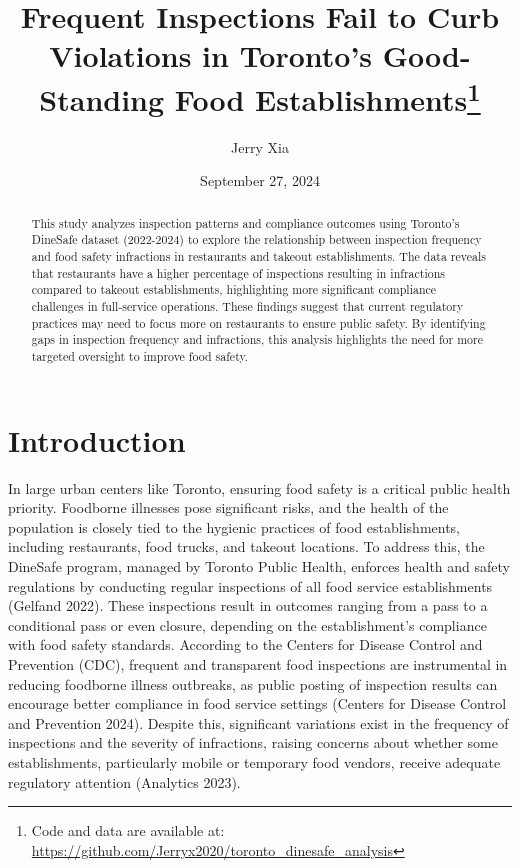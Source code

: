 \documentclass[
  letterpaper,
  DIV=11,
  numbers=noendperiod]{scrartcl}
\title{Frequent Inspections Fail to Curb Violations in Toronto's
Good-Standing Food Establishments\thanks{Code and data are available at:
\url{https://github.com/Jerryx2020/toronto_dinesafe_analysis}}}
\author{Jerry Xia}
\date{September 27, 2024}
\renewcommand*\contentsname{Table of contents}
\newcommand\contentsname{Table of contents}
\begin{document}
\maketitle
\begin{abstract}
This study analyzes inspection patterns and compliance outcomes using
Toronto's DineSafe dataset (2022-2024) to explore the relationship
between inspection frequency and food safety infractions in restaurants
and takeout establishments. The data reveals that restaurants have a
higher percentage of inspections resulting in infractions compared to
takeout establishments, highlighting more significant compliance
challenges in full-service operations. These findings suggest that
current regulatory practices may need to focus more on restaurants to
ensure public safety. By identifying gaps in inspection frequency and
infractions, this analysis highlights the need for more targeted
oversight to improve food safety.
\end{abstract}

\renewcommand*\contentsname{Table of contents}
{
\hypersetup{linkcolor=}
\setcounter{tocdepth}{3}
\tableofcontents
}

\section{Introduction}\label{introduction}

In large urban centers like Toronto, ensuring food safety is a critical
public health priority. Foodborne illnesses pose significant risks, and
the health of the population is closely tied to the hygienic practices
of food establishments, including restaurants, food trucks, and takeout
locations. To address this, the DineSafe program, managed by Toronto
Public Health, enforces health and safety regulations by conducting
regular inspections of all food service establishments (Gelfand 2022).
These inspections result in outcomes ranging from a pass to a
conditional pass or even closure, depending on the establishment's
compliance with food safety standards. According to the Centers for
Disease Control and Prevention (CDC), frequent and transparent food
inspections are instrumental in reducing foodborne illness outbreaks, as
public posting of inspection results can encourage better compliance in
food service settings (Centers for Disease Control and Prevention 2024).
Despite this, significant variations exist in the frequency of
inspections and the severity of infractions, raising concerns about
whether some establishments, particularly mobile or temporary food
vendors, receive adequate regulatory attention (Analytics 2023).
\end{document}
